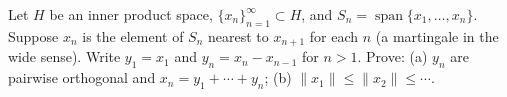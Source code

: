 Let $H$ be an inner product space, $\{x_n\}_{n=1}^{\infty} \subset H$, and $S_n = \operatorname{span}\{x_1,\ldots,x_n\}$. Suppose $x_n$ is the element of $S_n$ nearest to $x_{n+1}$ for each $n$ (a martingale in the wide sense). Write $y_1 = x_1$ and $y_n = x_n - x_{n-1}$ for $n > 1$. Prove: (a) $y_n$ are pairwise orthogonal and $x_n = y_1 + \cdots + y_n$; (b) $\|x_1\| \leq \|x_2\| \leq \cdots$.
